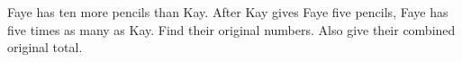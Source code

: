 Faye has ten more pencils than Kay. After Kay gives Faye five pencils, Faye has five times as many as Kay. Find their original numbers. Also give their combined original total.
